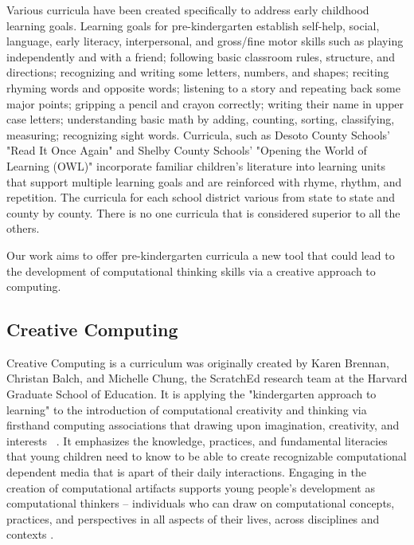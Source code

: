 \documentclass[11pt, letterpaper, onecolumn]{article}
\begin{document}
%
Various curricula have been created specifically to address early childhood learning goals. 
%
Learning goals for pre-kindergarten establish self-help, social, language, early literacy, interpersonal, and gross/fine motor skills such as playing independently and with a friend; following basic classroom rules, structure, and directions; recognizing and writing some letters, numbers, and shapes; reciting rhyming words and opposite words; listening to a story and repeating back some major points; gripping a pencil and crayon correctly; writing their name in upper case letters; understanding basic math by adding, counting, sorting, classifying, measuring; recognizing sight words.
%
Curricula, such as Desoto County Schools’ "Read It Once Again" and Shelby County Schools’ "Opening the World of Learning (OWL)" incorporate familiar children's literature into learning units that support multiple learning goals and are reinforced with rhyme, rhythm, and repetition. 
%
The curricula for each school district various from state to state and county by county.
%
There is no one curricula that is considered superior to all the others.
%

%
Our work aims to offer pre-kindergarten curricula a new tool that could lead to the development of computational thinking skills via a creative approach to computing.
%

\subsection{Creative Computing}
%
Creative Computing is a curriculum was originally created by  Karen Brennan, Christan Balch, and Michelle Chung, the ScratchEd research team at the Harvard Graduate School of Education.
%
It is applying the "kindergarten approach to learning" to the introduction of computational creativity and thinking via firsthand computing associations that drawing upon imagination, creativity, and interests ~\cite{Resnick2007SIGCHI}.
%
It emphasizes the knowledge, practices, and fundamental literacies that young children need to know to be able to create recognizable computational dependent media that is apart of their daily interactions. 
%
Engaging in the creation of computational artifacts supports young people’s development as computational thinkers – individuals who can draw on computational concepts, practices, and perspectives in all aspects of their lives, across disciplines and contexts \cite{brennan2014creative}.
\end{document}
